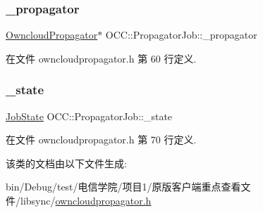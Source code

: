 \subsubsection{\texorpdfstring{\+\_\+propagator}{\_propagator}}
{\footnotesize\ttfamily \hyperlink{class_o_c_c_1_1_owncloud_propagator}{Owncloud\+Propagator}$\ast$ O\+C\+C\+::\+Propagator\+Job\+::\+\_\+propagator\hspace{0.3cm}{\ttfamily [protected]}}



在文件 owncloudpropagator.\+h 第 60 行定义.

\mbox{\label{class_o_c_c_1_1_propagator_job_aea25494dc656a1185a8b9f1edff69668}} 
\subsubsection{\texorpdfstring{\+\_\+state}{\_state}}
{\footnotesize\ttfamily \hyperlink{class_o_c_c_1_1_propagator_job_afe241af4af083af8c00b0c88c921fa32}{Job\+State} O\+C\+C\+::\+Propagator\+Job\+::\+\_\+state}



在文件 owncloudpropagator.\+h 第 70 行定义.



该类的文档由以下文件生成\+:\begin{DoxyCompactItemize}
\item 
bin/\+Debug/test/电信学院/项目1/原版客户端重点查看文件/libsync/\hyperlink{owncloudpropagator_8h}{owncloudpropagator.\+h}\end{DoxyCompactItemize}
